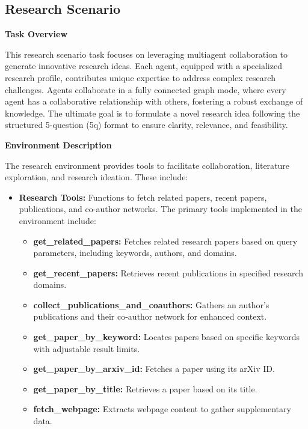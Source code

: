 \subsection{Research Scenario}
\label{app:research-scenario}

\textbf{Task Overview}

This research scenario task focuses on leveraging multiagent collaboration to generate innovative research ideas. Each agent, equipped with a specialized research profile, contributes unique expertise to address complex research challenges. Agents collaborate in a fully connected graph mode, where every agent has a collaborative relationship with others, fostering a robust exchange of knowledge. The ultimate goal is to formulate a novel research idea following the structured 5-question (5q) format to ensure clarity, relevance, and feasibility.

\textbf{Environment Description}

The research environment provides tools to facilitate collaboration, literature exploration, and research ideation. These include:
\begin{itemize}
    \item \textbf{Research Tools:} Functions to fetch related papers, recent papers, publications, and co-author networks. The primary tools implemented in the environment include:
    \begin{itemize}
        \item \textbf{get\_related\_papers:} Fetches related research papers based on query parameters, including keywords, authors, and domains.
        \item \textbf{get\_recent\_papers:} Retrieves recent publications in specified research domains.
        \item \textbf{collect\_publications\_and\_coauthors:} Gathers an author’s publications and their co-author network for enhanced context.
        \item \textbf{get\_paper\_by\_keyword:} Locates papers based on specific keywords with adjustable result limits.
        \item \textbf{get\_paper\_by\_arxiv\_id:} Fetches a paper using its arXiv ID.
        \item \textbf{get\_paper\_by\_title:} Retrieves a paper based on its title.
        \item \textbf{fetch\_webpage:} Extracts webpage content to gather supplementary data.
    \end{itemize}
\end{itemize}

